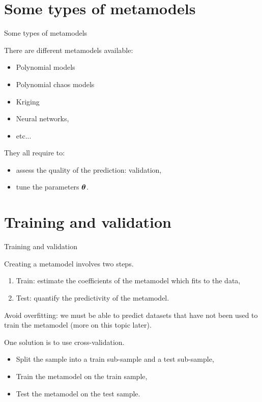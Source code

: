 \documentclass{beamer}
\begin{document}

\section{Some types of metamodels}
\begin{frame}[t]{Some types of metamodels}

There are different metamodels available:
\begin{itemize}
\item Polynomial models 
\item Polynomial chaos models 
\item Kriging
\item Neural networks, 
\item etc...
\end{itemize}

They all require to:
\begin{itemize}
\item assess the quality of the prediction: validation,
\item tune the parameters $\boldsymbol{\theta}$.
\end{itemize}

\end{frame}


\section{Training and validation}
\begin{frame}[t]{Training and validation}

Creating a metamodel involves two steps.
\begin{enumerate}
\item Train: estimate the coefficients of the metamodel 
which fits to the data,
\item Test: quantify the predictivity of the metamodel.
\end{enumerate}

Avoid overfitting: we must be able 
to predict datasets that have not been used to train the metamodel 
(more on this topic later).

One solution is to use cross-validation.
\begin{itemize}
\item Split the sample into a train sub-sample and a test sub-sample,
\item Train the metamodel on the train sample,
\item Test the metamodel on the test sample.
\end{itemize}

\end{frame}
\end{document}

